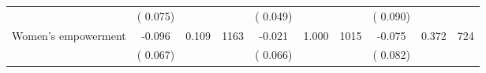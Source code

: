 \begin{tabular}{l*{9}{c}}
                               &        (       0.075) & &                                                                &       (       0.049) & &                                                         &       (       0.090) & & \\ 
 Women's empowerment                &             -0.096        &        0.109 & 1163        &             -0.021 &        1.000 & 1015               &       -0.075 &        0.372 & 724       \\ 
                               &        (       0.067) & &                                                                &       (       0.066) & &                                                         &       (       0.082) & & \\ 
\hline \end{tabular}                                                                                                                                                      